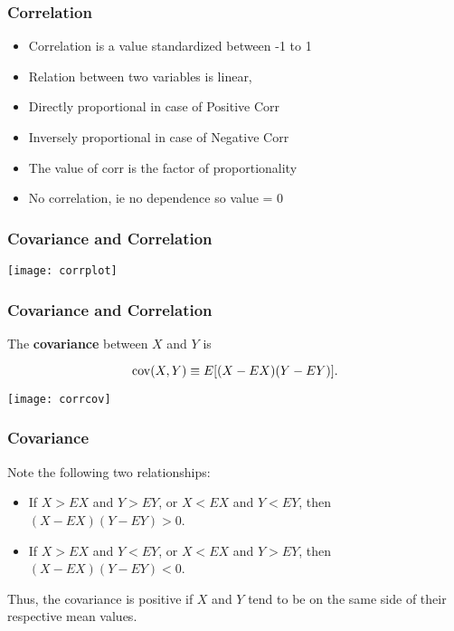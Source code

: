 \begin{frame}[fragile]\frametitle{Correlation}
\begin{itemize}
\item Correlation is a value standardized between -1 to 1
\item Relation between two variables is linear, 
\item Directly proportional in case of Positive Corr
\item Inversely proportional in case of Negative Corr
\item The value of corr is the factor of proportionality
\item No correlation, ie no dependence so value = 0
\end{itemize}
\end{frame}

\begin{frame}[fragile]\frametitle{Covariance and Correlation}
\begin{center}
\texttt{[image: corrplot]}
\end{center}
\end{frame}

\begin{frame}[fragile]\frametitle{Covariance and Correlation}
The {\bf covariance} between $X$ and $Y$ is

$$
{\rm cov}(X,Y) \equiv E[(X-EX)(Y-EY)].
$$

\begin{center}
\texttt{[image: corrcov]}
\end{center}
\end{frame}


\begin{frame}
\frametitle{Covariance}
%
%
%

Note the following two relationships:

\begin{itemize}

\item If $X>EX$ and $Y>EY$, or $X<EX$ and $Y<EY$, then $(X-EX)(Y-EY)>0$.

\item If $X>EX$ and $Y<EY$, or $X<EX$ and $Y>EY$, then $(X-EX)(Y-EY)<0$.

\end{itemize}

Thus, the covariance is positive if $X$ and $Y$ tend to be on the same
side of their respective mean values.

\end{frame}

